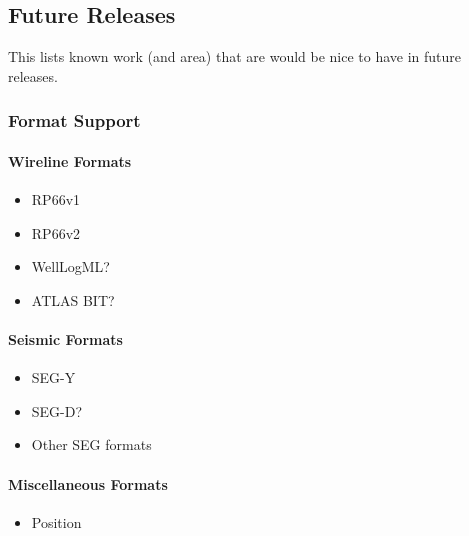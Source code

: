 \documentclass[letterpaper,10pt,english]{sphinxmanual}
\begin{document}
\subsection{Future Releases}
\label{\detokenize{TODO:future-releases}}
This lists known work (and area) that are would be nice to have in future releases.


\subsubsection{Format Support}
\label{\detokenize{TODO:format-support}}

\paragraph{Wireline Formats}
\label{\detokenize{TODO:wireline-formats}}\begin{itemize}
\item {} 
RP66v1

\item {} 
RP66v2

\item {} 
WellLogML?

\item {} 
ATLAS BIT?

\end{itemize}


\paragraph{Seismic Formats}
\label{\detokenize{TODO:seismic-formats}}\begin{itemize}
\item {} 
SEG-Y

\item {} 
SEG-D?

\item {} 
Other SEG formats

\end{itemize}


\paragraph{Miscellaneous Formats}
\label{\detokenize{TODO:miscellaneous-formats}}\begin{itemize}
\item {} 
Position

\end{itemize}
\end{document}
